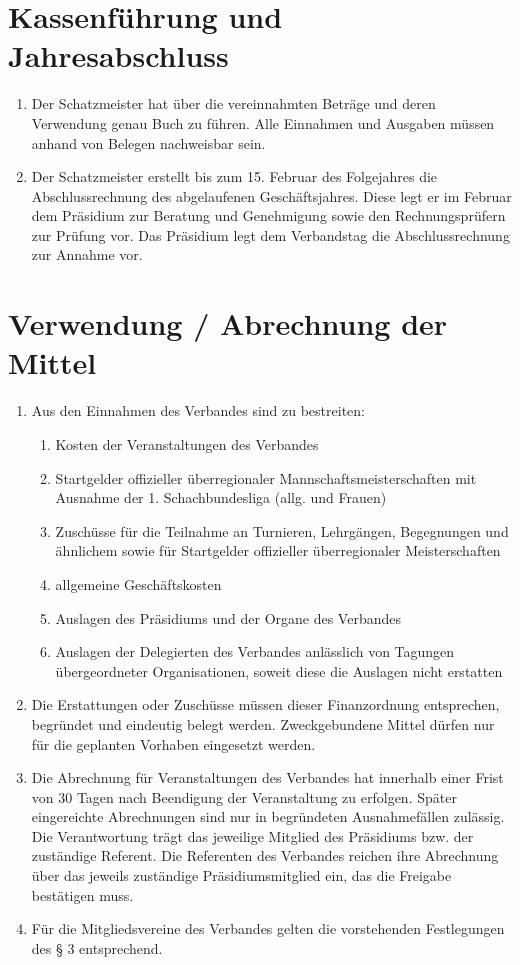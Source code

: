 \documentclass[fontsize=12pt, paper=a4, ngerman]{article}
\begin{document}
\section{Kassenführung und Jahresabschluss}
\begin{enumerate}
\item Der Schatzmeister hat über die vereinnahmten Beträge und deren Verwendung genau
Buch zu führen. Alle Einnahmen und Ausgaben müssen anhand von Belegen nachweisbar
sein.
\item Der Schatzmeister erstellt bis zum 15. Februar des Folgejahres die Abschlussrechnung
des abgelaufenen Geschäftsjahres. Diese legt er im Februar dem Präsidium zur Beratung
und Genehmigung sowie den Rechnungsprüfern zur Prüfung vor. Das Präsidium legt dem
Verbandstag die Abschlussrechnung zur Annahme vor.
\end{enumerate}

\section{Verwendung / Abrechnung der Mittel}
\begin{enumerate}
\item Aus den Einnahmen des Verbandes sind zu bestreiten:
  \begin{enumerate}[label=-]
  \item Kosten der Veranstaltungen des Verbandes
  \item Startgelder offizieller überregionaler Mannschaftsmeisterschaften mit Ausnahme der 1. Schachbundesliga (allg. und Frauen)
  \item Zuschüsse für die Teilnahme an Turnieren, Lehrgängen, Begegnungen und ähnlichem sowie für Startgelder
  offizieller überregionaler Meisterschaften
  \item allgemeine Geschäftskosten
  \item Auslagen des Präsidiums und der Organe des Verbandes
  \item Auslagen der Delegierten des Verbandes anlässlich von Tagungen übergeordneter Organisationen, soweit diese die Auslagen
  nicht erstatten
  \end{enumerate}
\item Die Erstattungen oder Zuschüsse müssen dieser Finanzordnung entsprechen, begründet
und eindeutig belegt werden. Zweckgebundene Mittel dürfen nur für die geplanten
Vorhaben eingesetzt werden.
\item Die Abrechnung für Veranstaltungen des Verbandes hat innerhalb einer Frist von 30 Tagen nach Beendigung der Veranstaltung
zu erfolgen. Später eingereichte Abrechnungen sind nur in begründeten Ausnahmefällen
zulässig. Die Verantwortung trägt das jeweilige Mitglied des
Präsidiums bzw. der zuständige Referent. Die Referenten des Verbandes
reichen ihre Abrechnung über das jeweils zuständige Präsidiumsmitglied ein, das die Freigabe bestätigen muss.
\item Für die Mitgliedsvereine des Verbandes gelten die vorstehenden Festlegungen des § 3 entsprechend.
\end{enumerate}
\end{document}
